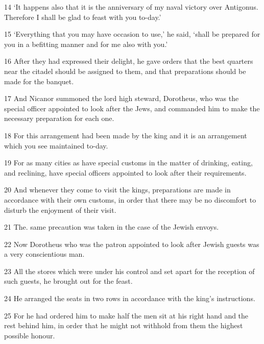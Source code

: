 \par 14 ‘It happens also that it is the anniversary of my naval victory over Antigonus. Therefore I shall be glad to feast with you to-day.’

\par 15 ‘Everything that you may have occasion to use,’ he said, ‘shall be prepared for you in a befitting manner and for me also with you.’

\par 16 After they had expressed their delight, he gave orders that the best quarters near the citadel should be assigned to them, and that preparations should be made for the banquet.

\par 17 And Nicanor summoned the lord high steward, Dorotheus, who was the special officer appointed to look after the Jews, and commanded him to make the necessary preparation for each one.

\par 18 For this arrangement had been made by the king and it is an arrangement which you see maintained to-day.

\par 19 For as many cities as have special customs in the matter of drinking, eating, and reclining, have special officers appointed to look after their requirements.

\par 20 And whenever they come to visit the kings, preparations are made in accordance with their own customs, in order that there may be no discomfort to disturb the enjoyment of their visit.

\par 21 The. same precaution was taken in the case of the Jewish envoys.

\par 22 Now Dorotheus who was the patron appointed to look after Jewish guests was a very conscientious man.

\par 23 All the stores which were under his control and set apart for the reception of such guests, he brought out for the feast.

\par 24 He arranged the seats in two rows in accordance with the king's instructions.

\par 25 For he had ordered him to make half the men sit at his right hand and the rest behind him, in order that he might not withhold from them the highest possible honour.

